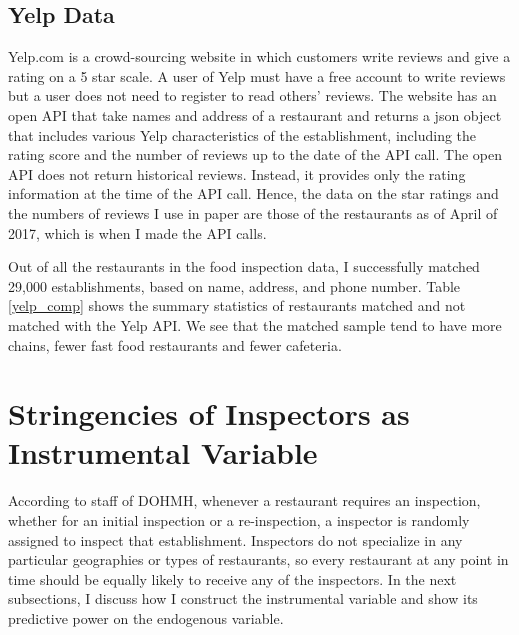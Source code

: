 \documentclass[12pt]{article}
\begin{document}
\subsection{Yelp Data}

Yelp.com is a crowd-sourcing website in which customers write reviews and give a rating on a 5 star scale. A user of Yelp must have a free account to write reviews but a user does not need to register to read others' reviews. The website has an open API that take names and address of a restaurant and returns a json object that includes various Yelp characteristics of the establishment, including the rating score and the number of reviews up to the date of the API call. The open API does not return historical reviews. Instead, it provides only the rating information at the time of the API call. Hence, the data on the star ratings and the numbers of reviews I use in paper are those of the restaurants as of April of 2017, which is when I made the API calls. 

Out of all the restaurants in the food inspection data, I successfully matched 29,000 establishments, based on name, address, and phone number. Table \ref{yelp_comp} shows the summary statistics of restaurants matched and not matched with the Yelp API. We see that the matched sample tend to have more chains, fewer fast food restaurants and fewer cafeteria. 

\section{Stringencies of Inspectors as Instrumental Variable}
\label{IV}
According to staff of DOHMH, whenever a restaurant requires an inspection, whether for an initial inspection or a re-inspection, a inspector is randomly assigned to inspect that establishment. Inspectors do not specialize in any particular geographies or types of restaurants, so every restaurant at any point in time should be equally likely to receive any of the inspectors. In the next subsections, I discuss how I construct the instrumental variable and show its predictive power on the endogenous variable. 
 
\end{document}
